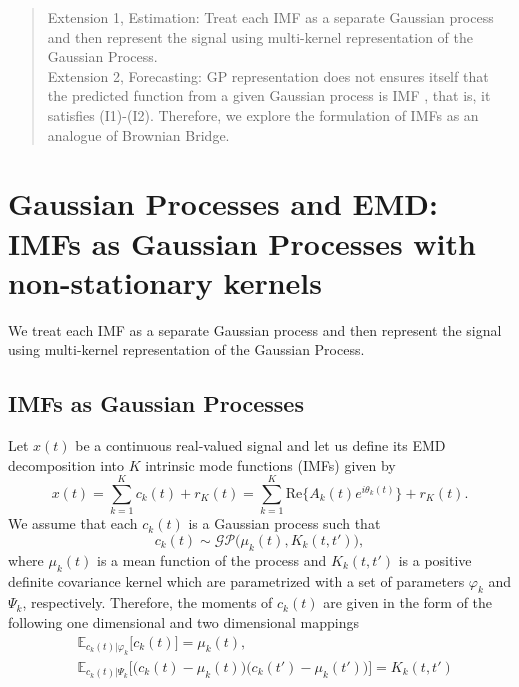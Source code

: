 \documentclass[article,moreauthors,pdftex,10pt,a4paper]{ssrn}
\begin{document}
\begin{abstract}
Extension 1, Estimation: Treat each IMF as a separate Gaussian process and then represent the signal using multi-kernel representation of the Gaussian Process. \\
Extension 2, Forecasting: GP representation does not ensures itself that the predicted function from a given Gaussian process is IMF , that is, it satisfies (I1)-(I2). Therefore, we  explore the formulation of IMFs as an analogue of Brownian Bridge.
\end{abstract}



\section{Gaussian Processes and EMD: IMFs as Gaussian Processes with non-stationary kernels}
We treat each IMF as a separate Gaussian process and then represent the signal using multi-kernel representation of the Gaussian Process.

\subsection{IMFs as Gaussian Processes}
Let $x(t)$ be a continuous real-valued signal and let us define its EMD decomposition into $K$ intrinsic mode functions (IMFs) given by 
\begin{equation}\label{eq:model_x_EMD}
x(t) = \sum_{k = 1}^K c_k(t) + r_K(t) = \sum_{k = 1}^K \text{Re}\Big\{ A_k(t)  e^{i \theta_k(t)} \Big\} + r_K(t).
\end{equation}
We assume that each $c_k(t)$ is a Gaussian process such that 
\begin{equation}\label{eq:model_IMF_GP_k}
c_k(t) \sim \mathcal{GP} \Big( \mu_k(t), K_k(t,t')\Big), 
\end{equation}
where $\mu_k(t)$ is a mean function of the process and $K_k(t,t')$ is a positive definite covariance kernel which are parametrized with a set of parameters $\varphi_{k}$ and $\Psi_{k}$, respectively. Therefore, the moments of $c_k(t)$ are given in the form of the following one dimensional and two dimensional mappings
\begin{align*}
&\mathbb{E}_{ c_k(t)| \varphi_{k}} \big[ c_k(t)\big] = \mu_k(t), \\
& \mathbb{E}_{ c_k(t)| \Psi_{k}} \Big[ \big(c_k(t) - \mu_k(t) \big)\big(c_k(t') - \mu_k(t') \big) \Big] = K_k(t,t')
\end{align*}
\end{document}
